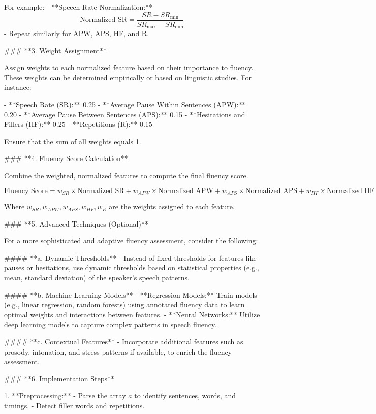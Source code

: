 For example:
- **Speech Rate Normalization:**
  \[
  \text{Normalized SR} = \frac{SR - SR_{\text{min}}}{SR_{\text{max}} - SR_{\text{min}}}
  \]
- Repeat similarly for APW, APS, HF, and R.

### **3. Weight Assignment**

Assign weights to each normalized feature based on their importance to fluency. These weights can be determined empirically or based on linguistic studies. For instance:

- **Speech Rate (SR):** 0.25
- **Average Pause Within Sentences (APW):** 0.20
- **Average Pause Between Sentences (APS):** 0.15
- **Hesitations and Fillers (HF):** 0.25
- **Repetitions (R):** 0.15

Ensure that the sum of all weights equals 1.

### **4. Fluency Score Calculation**

Combine the weighted, normalized features to compute the final fluency score.

\[
\text{Fluency Score} = w_{SR} \times \text{Normalized SR} + w_{APW} \times \text{Normalized APW} + w_{APS} \times \text{Normalized APS} + w_{HF} \times \text{Normalized HF} + w_{R} \times \text{Normalized R}
\]

Where \( w_{SR}, w_{APW}, w_{APS}, w_{HF}, w_{R} \) are the weights assigned to each feature.

### **5. Advanced Techniques (Optional)**

For a more sophisticated and adaptive fluency assessment, consider the following:

#### **a. Dynamic Thresholds**
   - Instead of fixed thresholds for features like pauses or hesitations, use dynamic thresholds based on statistical properties (e.g., mean, standard deviation) of the speaker’s speech patterns.

#### **b. Machine Learning Models**
   - **Regression Models:** Train models (e.g., linear regression, random forests) using annotated fluency data to learn optimal weights and interactions between features.
   - **Neural Networks:** Utilize deep learning models to capture complex patterns in speech fluency.

#### **c. Contextual Features**
   - Incorporate additional features such as prosody, intonation, and stress patterns if available, to enrich the fluency assessment.

### **6. Implementation Steps**

1. **Preprocessing:**
   - Parse the array \( a \) to identify sentences, words, and timings.
   - Detect filler words and repetitions.


